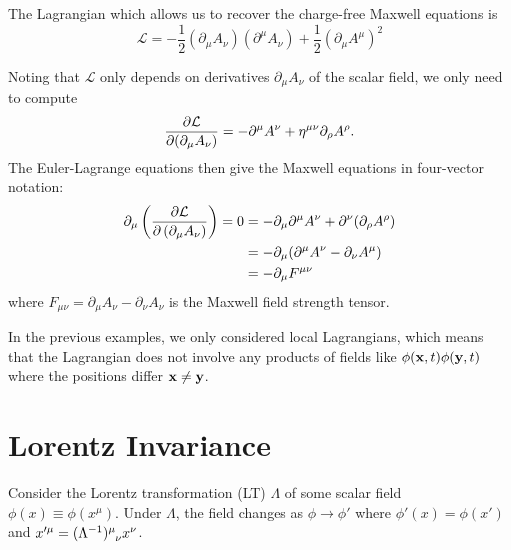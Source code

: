 

\begin{example}

The Lagrangian which allows us to recover the charge-free Maxwell equations is
\begin{equation}
  \mathcal{L} = -\frac{1}{2} (\partial_\mu A_\nu) (\partial^\mu A_\nu) + \frac{1}{2}(\partial_\mu A^\mu)^2
\end{equation}

Noting that $\mathcal{L}$ only depends on derivatives $\partial_\mu A_\nu$ of the scalar field, we only need to compute
\begin{equation}
  \pdv{\mathcal{L}}{(\partial_\mu A_\nu)} = -\partial^\mu A^\nu + \eta\indices{^\mu^\nu}\partial_\rho A^\rho.
\end{equation}
The Euler-Lagrange equations then give the Maxwell equations in four-vector notation:
\begin{align}
  \partial_\mu \left( \pdv{\mathcal{L}}{\left( \partial_\mu A_\nu \right)} \right) = 0 &= -\partial_\mu \partial^\mu A^\nu + \partial^\nu (\partial_\rho A^\rho) \\
  &= -\partial_\mu (\partial^\mu A^\nu - \partial_\nu A^\mu) \\
  &= -\partial_\mu F^{\mu \nu}
\end{align}
where $F_{\mu \nu} = \partial_\mu A_\nu - \partial_\nu A_\nu$ is the Maxwell field strength tensor.
\end{example}
In the previous examples, we only considered local Lagrangians, which means that the Lagrangian does not involve any products of fields like $\phi(\vb{x}, t) \phi(\vb{y}, t)$ where the positions differ $\vb{x} \neq \vb{y}$.

\section{Lorentz Invariance}%
\label{sec:lorentz_invariance}

Consider the Lorentz transformation (LT) $\Lambda$ of some scalar field $\phi(x) \equiv \phi(x^\mu)$.
Under $\Lambda$, the field changes as $\phi \to \phi'$ where $\phi'(x) = \phi(x')$ and $x'^\mu = (\Lambda^{-1})\indices{^\mu_\nu} x^\nu$.

